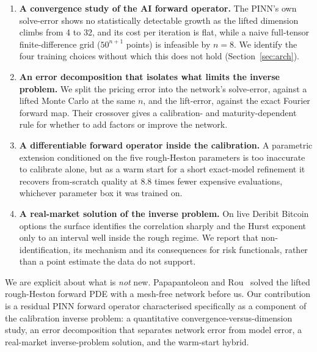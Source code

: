 \documentclass[preprint,12pt]{elsarticle}
\begin{document}
\begin{enumerate}

\item \textbf{A convergence study of the AI forward operator.} The PINN's own
solve-error shows no statistically detectable growth as the lifted dimension
climbs from 4 to 32, and its cost per iteration is flat, while a naive
full-tensor finite-difference grid ($50^{n+1}$ points) is infeasible by $n{=}8$.
We identify the four training choices without which this does not hold
(Section~\ref{sec:arch}).

\item \textbf{An error decomposition that isolates what limits the inverse
problem.} We split the pricing error into the network's solve-error, against a
lifted Monte Carlo at the same $n$, and the lift-error, against the exact
Fourier forward map. Their crossover gives a calibration- and
maturity-dependent rule for whether to add factors or improve the network.

\item \textbf{A differentiable forward operator inside the calibration.} A
parametric extension conditioned on the five rough-Heston parameters is too
inaccurate to calibrate alone, but as a warm start for a short exact-model
refinement it recovers from-scratch quality at $8.8$ times fewer expensive
evaluations, whichever parameter box it was trained on.

\item \textbf{A real-market solution of the inverse problem.} On live Deribit
Bitcoin options the surface identifies the correlation sharply and the Hurst
exponent only to an interval well inside the rough regime. We report that
non-identification, its mechanism and its consequences for risk functionals,
rather than a point estimate the data do not support.

\end{enumerate}

We are explicit about what is \emph{not} new.
Papapantoleon and Rou~\citep{papapantoleon2025timestepping} solved the lifted rough-Heston forward PDE
with a mesh-free network before us. Our contribution is a residual PINN forward
operator characterised specifically as a component of the calibration inverse
problem: a quantitative convergence-versus-dimension study, an error
decomposition that separates network error from model error, a real-market
inverse-problem solution, and the warm-start hybrid.

\end{document}
